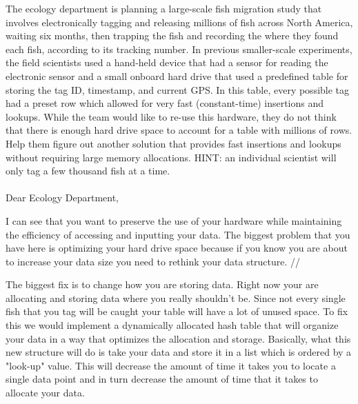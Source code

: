 \documentclass[12pt]{article}
\begin{document}
\renewcommand{\headrulewidth}{0.5pt}

\phantom{Test}

The ecology department is planning a large-scale fish migration study that
involves electronically tagging and releasing millions of fish across North
America, waiting six months, then trapping the fish and recording the where
they found each fish, according to its tracking number. In previous
smaller-scale experiments, the field scientists used a hand-held device that
had a sensor for reading the electronic sensor and a small onboard hard drive
that used a predefined table for storing the tag ID, timestamp, and current
GPS. In this table, every possible tag had a preset row which allowed for very
fast (constant-time) insertions and lookups. While the team would like to
re-use this hardware, they do not think that there is enough hard drive space
to account for a table with millions of rows. Help them figure out another
solution that provides fast insertions and lookups without requiring large
memory allocations. HINT: an individual scientist will only tag a few thousand
fish at a time.\\\\

Dear Ecology Department,

I can see that you want to preserve the use of your hardware while maintaining the efficiency of accessing and inputting your data. The biggest problem that you have here is optimizing your hard drive space because if you know you are about to increase your data size you need to rethink your data structure. //

The biggest fix is to change how you are storing data. Right now your are allocating and storing data where you really shouldn't be. Since not every single fish that you tag will be caught your table will have a lot of unused space. To fix this we would implement a dynamically allocated hash table that will organize your data in a way that optimizes the allocation and storage. Basically, what this new structure will do is take your data and store it in a list which is ordered by a "look-up" value. This will decrease the amount of time it takes you to locate a single data point and in turn decrease the amount of time that it takes to allocate your data.\\
\end{document}
